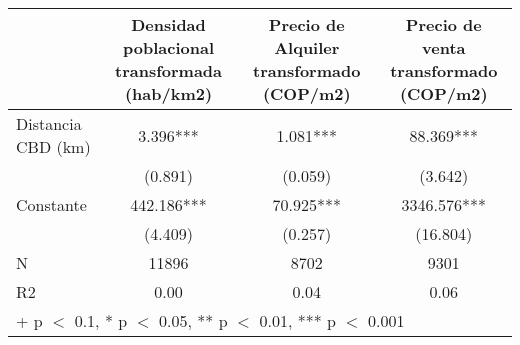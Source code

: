 \begin{table}
\centering
\begin{tabular}[t]{lccc}
\toprule
  & Densidad poblacional transformada (hab/km2) & Precio de Alquiler transformado (COP/m2) & Precio de venta transformado (COP/m2)\\
\midrule
Distancia CBD (km) & \num{3.396}*** & \num{1.081}*** & \num{88.369}***\\
 & (\num{0.891}) & (\num{0.059}) & (\num{3.642})\\
Constante & \num{442.186}*** & \num{70.925}*** & \num{3346.576}***\\
 & (\num{4.409}) & (\num{0.257}) & (\num{16.804})\\
\midrule
N & \num{11896} & \num{8702} & \num{9301}\\
R2 & \num{0.00} & \num{0.04} & \num{0.06}\\
\bottomrule
\multicolumn{4}{l}{\rule{0pt}{1em}+ p $<$ 0.1, * p $<$ 0.05, ** p $<$ 0.01, *** p $<$ 0.001}\\
\end{tabular}
\end{table}

